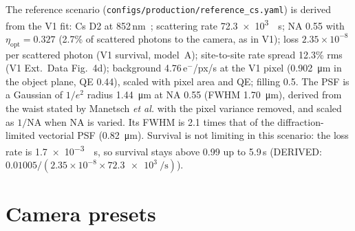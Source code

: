 \documentclass[11pt,a4paper]{article}
\newcommand{\file}[1]{\nolinkurl{#1}}
\newcommand{\elec}{e$^-$}
\begin{document}
The reference scenario (\file{configs/production/reference_cs.yaml}) is derived from the V1 fit: Cs
D2 at 852\,nm~\cite{steck}; scattering rate \SI{72.3e3}{\per\second}; NA 0.55 with
$\eta_\mathrm{opt} = 0.327$ (2.7\% of scattered photons to the camera, as in V1); loss
$2.35\times10^{-8}$ per scattered photon (V1 survival, model~A); site-to-site rate spread 12.3\% rms
(V1 Ext.\ Data Fig.~4d); background 4.76\,\elec/px/s at the V1 pixel
(\SI{0.902}{\micro\metre} in the object plane, QE 0.44), scaled with pixel area and QE; filling 0.5.
The PSF is a Gaussian of $1/e^2$ radius \SI{1.44}{\micro\metre} at NA 0.55 (FWHM
\SI{1.70}{\micro\metre}), derived from the waist stated by Manetsch \textit{et al.} with the pixel
variance removed, and scaled as $1/\mathrm{NA}$ when NA is varied. Its FWHM is 2.1 times that of the
diffraction-limited vectorial PSF (\SI{0.82}{\micro\metre}). Survival is not limiting in this
scenario: the loss rate is \SI{1.7e-3}{\per\second}, so survival stays above 0.99 up to 5.9\,s
(DERIVED: $0.01005/(2.35\times10^{-8}\times\SI{72.3e3}{\per\second})$).

\section{Camera presets}
\end{document}
